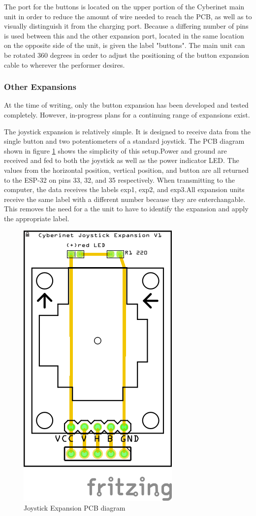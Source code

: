 The port for the buttons is located on the upper portion of the Cyberinet main unit in order to reduce the amount of wire needed to reach the PCB, as well as to visually distinguish it from the charging port. Because a differing number of pins is used between this and the other expansion port, located in the same location on the opposite side of the unit, is given the label "buttons". The main unit can be rotated 360 degrees in order to adjust the positioning of the button expansion cable to wherever the performer desires.

\subsubsection{Other Expansions}
At the time of writing, only the button expansion has been developed and tested completely. However, in-progress plans for a continuing range of expansions exist.

The joystick expansion is relatively simple. It is designed to receive data from the single button and two potentiometers of a standard joystick. The PCB diagram shown in figure \ref{fig:jsPCB} shows the simplicity of this setup.Power and ground are received and fed to both the joystick as well as the power indicator LED. The values from the horizontal position, vertical position, and button are all returned to the ESP-32 on pins 33, 32, and 35 respectively. When transmitting to the computer, the data receives the labels exp1, exp2, and exp3.All expansion units receive the same label with a different number because they are enterchangable. This removes the need for a the unit to have to identify the expansion and apply the appropriate label.

\begin{figure}
    \centering
    \includegraphics{diagrams/PCBs/thumbPCBv1.png}
    \caption{Joystick Expansion PCB diagram}
    \label{fig:jsPCB}
\end{figure}

